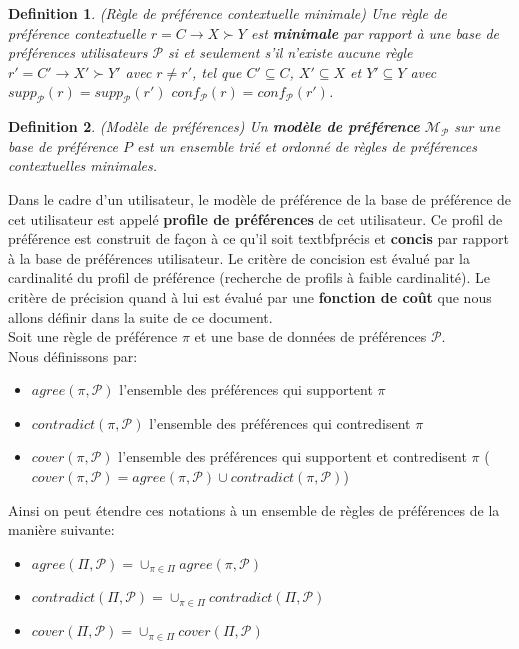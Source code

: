 \documentclass[a4paper,12pt,openany,oneside]{article}
\newtheorem{defn}{Definition} %
\begin{document}
\begin{defn}(Règle de préférence contextuelle minimale)
Une règle de préférence contextuelle $r=C\rightarrow X\succ Y$ est \textbf{minimale} par rapport à une base de préférences utilisateurs $\mathcal{P}$ si et seulement s'il n'existe aucune règle $r'=C'\rightarrow X'\succ Y'$ avec $r\neq r'$, tel que $C'\subseteq C$, $X'\subseteq X$ et $Y'\subseteq Y$ avec $supp_\mathcal{P}(r)=supp_\mathcal{P}(r')$ $conf_\mathcal{P}(r)=conf_\mathcal{P}(r')$.
\end{defn}

\begin{defn}(Modèle de préférences)
Un \textbf{modèle de préférence} $\mathcal{M}_\mathcal{P}$ sur une base de préférence $P$ est un ensemble trié et ordonné de règles de préférences contextuelles minimales.
\end{defn}
Dans le cadre d'un utilisateur, le modèle de préférence de la base de préférence de cet utilisateur est appelé \textbf{profile de préférences} de cet utilisateur.
Ce profil de préférence est construit de façon à ce qu'il soit textbf{précis} et \textbf{concis} par rapport à la base de préférences utilisateur. Le critère de concision est évalué par la cardinalité du profil de préférence (recherche de profils à faible cardinalité). Le critère de précision quand à lui est évalué par une \textbf{fonction de coût} que nous allons définir dans la suite de ce document.\\
Soit une règle de préférence $\pi$ et une base de données de préférences $\mathcal{P}$. \\
Nous définissons par:
\begin{itemize}
	\item $agree(\pi,\mathcal{P})$ l'ensemble des préférences qui supportent $\pi$ 
	\item $contradict(\pi,\mathcal{P})$ l'ensemble des préférences qui contredisent $\pi$ 
	\item $cover(\pi,\mathcal{P})$ l'ensemble des préférences qui supportent et contredisent $\pi$ ($cover(\pi,\mathcal{P})=agree(\pi,\mathcal{P})\cup contradict(\pi,\mathcal{P})$) 
\end{itemize}

Ainsi on peut étendre ces notations à un ensemble de règles de préférences de la manière suivante:
\begin{itemize}
	\item $agree(\Pi,\mathcal{P})=\cup_{\pi \in \Pi} agree(\pi,\mathcal{P})$ 
	\item $contradict(\Pi,\mathcal{P}) =\cup_{\pi\in\Pi}contradict(\Pi,\mathcal{P})$
	\item $cover(\Pi,\mathcal{P})=\cup_{\pi\in\Pi}cover(\Pi,\mathcal{P})$
\end{itemize}
\end{document}
